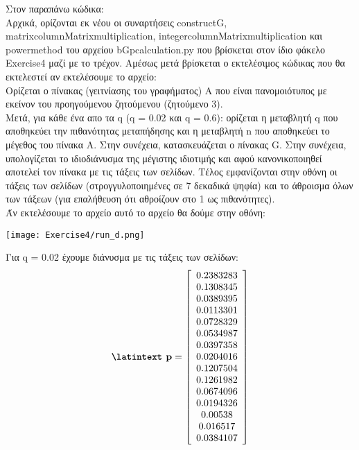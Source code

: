 \documentclass[a4paper,11pt]{article}
\newcommand{\lt}{\latintext}
\begin{document}
Στον παραπάνω κώδικα:\\
Αρχικά, ορίζονται εκ νέου οι  συναρτήσεις {\lt construct\textunderscore G}, {\lt matrix\textunderscore columnMatrix\textunderscore multiplication}, {\lt integer\textunderscore columnMatrix\textunderscore multiplication} και {\lt power\textunderscore method} του αρχείου {\lt b\textunderscore G\textunderscore p\textunderscore calculation.py} που βρίσκεται στον ίδιο φάκελο {\lt Exercise4} μαζί με το τρέχον.
Αμέσως μετά βρίσκεται ο εκτελέσιμος κώδικας που θα εκτελεστεί αν εκτελέσουμε το αρχείο:\\
Ορίζεται ο πίνακας (γειτνίασης του γραφήματος) Α που είναι πανομοιότυπος με εκείνον του προηγούμενου ζητούμενου (ζητούμενο 3).\\
Μετά, για κάθε ένα απο τα {\lt q} ({\lt q = 0.02} και {\lt q = 0.6}): ορίζεται η μεταβλητή {\lt q} που αποθηκεύει την πιθανότητας μεταπήδησης και η μεταβλητή {\lt n} που αποθηκεύει το μέγεθος του πίνακα Α. Στην συνέχεια, κατασκευάζεται ο πίνακας {\lt G}. Στην συνέχεια, υπολογίζεται το ιδιοδιάνυσμα της μέγιστης ιδιοτιμής και αφού κανονικοποιηθεί αποτελεί τον πίνακα με τις τάξεις των σελίδων. Τέλος εμφανίζονται στην οθόνη οι τάξεις των σελίδων (στρογγυλοποιημένες σε 7 δεκαδικά ψηφία) και το άθροισμα όλων των τάξεων (για επαλήθευση ότι αθροίζουν στο 1 ως πιθανότητες).\\

Άν εκτελέσουμε το αρχείο αυτό το αρχείο θα δούμε στην οθόνη:\\
\begin{center}
    \texttt{[image: Exercise4/run\_d.png]}\\
\end{center}

Για {\lt q = 0.02} έχουμε διάνυσμα με τις τάξεις των σελίδων:\\
\[\textbf{{\lt p}}=
    \left[ \begin{array}{c}
    0.2383283 \\
    0.1308345 \\
    0.0389395 \\
    0.0113301 \\
    0.0728329 \\
    0.0534987 \\
    0.0397358 \\
    0.0204016 \\
    0.1207504 \\
    0.1261982 \\
    0.0674096 \\
    0.0194326 \\
    0.00538 \\
    0.016517 \\
    0.0384107 \\
    \end{array} \right]
\]
\end{document}
